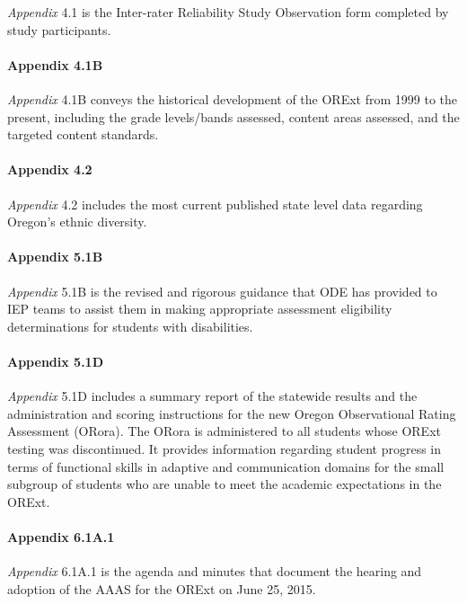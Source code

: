 \documentclass[]{article}
\let\oldparagraph\paragraph
\renewcommand{\paragraph}[1]{\oldparagraph{#1}\mbox{}}
\begin{document}
\emph{Appendix} 4.1 is the Inter-rater Reliability Study Observation
form completed by study participants.

\paragraph{Appendix 4.1B}\label{appendix-4.1b}

\emph{Appendix} 4.1B conveys the historical development of the ORExt
from 1999 to the present, including the grade levels/bands assessed,
content areas assessed, and the targeted content standards.

\paragraph{Appendix 4.2}\label{appendix-4.2}

\emph{Appendix} 4.2 includes the most current published state level data
regarding Oregon's ethnic diversity.

\paragraph{Appendix 5.1B}\label{appendix-5.1b}

\emph{Appendix} 5.1B is the revised and rigorous guidance that ODE has
provided to IEP teams to assist them in making appropriate assessment
eligibility determinations for students with disabilities.

\paragraph{Appendix 5.1D}\label{appendix-5.1d}

\emph{Appendix} 5.1D includes a summary report of the statewide results
and the administration and scoring instructions for the new Oregon
Observational Rating Assessment (ORora). The ORora is administered to
all students whose ORExt testing was discontinued. It provides
information regarding student progress in terms of functional skills in
adaptive and communication domains for the small subgroup of students
who are unable to meet the academic expectations in the ORExt.

\paragraph{Appendix 6.1A.1}\label{appendix-6.1a.1}

\emph{Appendix} 6.1A.1 is the agenda and minutes that document the
hearing and adoption of the AAAS for the ORExt on June 25, 2015.
\end{document}
